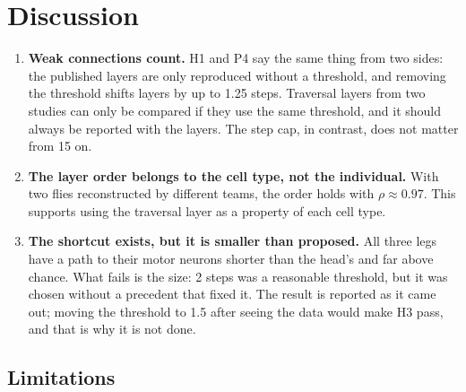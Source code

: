 \documentclass[11pt,letterpaper]{article}
\begin{document}
\section{Discussion}

\begin{enumerate}
  \item \textbf{Weak connections count.} H1 and P4 say the same thing from two sides: the published layers are only reproduced without a threshold, and removing the threshold shifts layers by up to 1.25 steps. Traversal layers from two studies can only be compared if they use the same threshold, and it should always be reported with the layers. The step cap, in contrast, does not matter from 15 on.
  \item \textbf{The layer order belongs to the cell type, not the individual.} With two flies reconstructed by different teams, the order holds with $\rho \approx 0.97$. This supports using the traversal layer as a property of each cell type.
  \item \textbf{The shortcut exists, but it is smaller than proposed.} All three legs have a path to their motor neurons shorter than the head's and far above chance. What fails is the size: 2 steps was a reasonable threshold, but it was chosen without a precedent that fixed it. The result is reported as it came out; moving the threshold to 1.5 after seeing the data would make H3 pass, and that is why it is not done.
\end{enumerate}

\subsection{Limitations}
\end{document}
